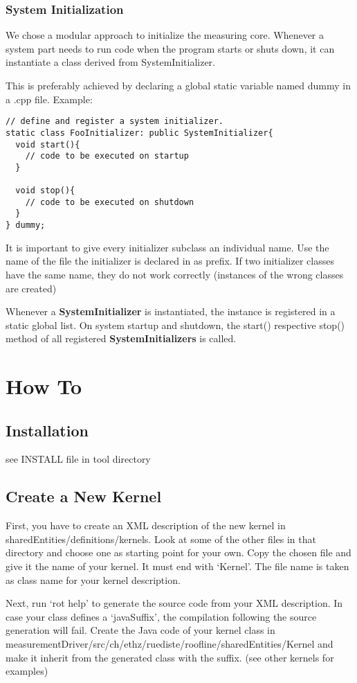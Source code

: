 \documentclass[a4paper,12pt]{report}
\newcommand{\class}[1]{\textbf{#1}}
\begin{document}
\subsection{System Initialization}
We chose a modular approach to initialize the measuring core. Whenever a system
part needs to run code when the program starts or shuts down, it can instantiate
a class derived from SystemInitializer.

This is preferably achieved by declaring a global static variable named dummy
in a .cpp file. Example:
\begin{verbatim}
// define and register a system initializer.
static class FooInitializer: public SystemInitializer{
  void start(){
    // code to be executed on startup
  }

  void stop(){
    // code to be executed on shutdown
  }
} dummy;
\end{verbatim}

It is important to give every initializer subclass an individual name. Use the
name of the file the initializer is declared in as prefix. If two initializer
classes have the same name, they do not work correctly (instances of the wrong
classes are created)

Whenever a \class{SystemInitializer} is instantiated, the instance is registered in a
static global list. On system startup and shutdown, the start() respective
stop() method of all registered \class{SystemInitializers} is called.

\chapter{How To}
\section{Installation}
\label{sec:HowtoInstall}
see INSTALL file in tool directory

\section{Create a New Kernel}
First, you have to create an XML description of the new kernel in
sharedEntities/definitions/kernels. Look at some of the other files in that
directory and choose one as starting point for your own. Copy the chosen file
and give it the name of your kernel. It must end with `Kernel'. The file name is
taken as class name for your kernel description.

Next, run `rot help' to generate the source code from your XML description. In
case your class defines a `javaSuffix', the compilation following the source
generation will fail. Create the Java code of your kernel class in
measurementDriver/src/ch/ethz/ruediste/roofline/sharedEntities/Kernel and make
it inherit from the generated class with the suffix. (see other kernels for
examples)
\end{document}
